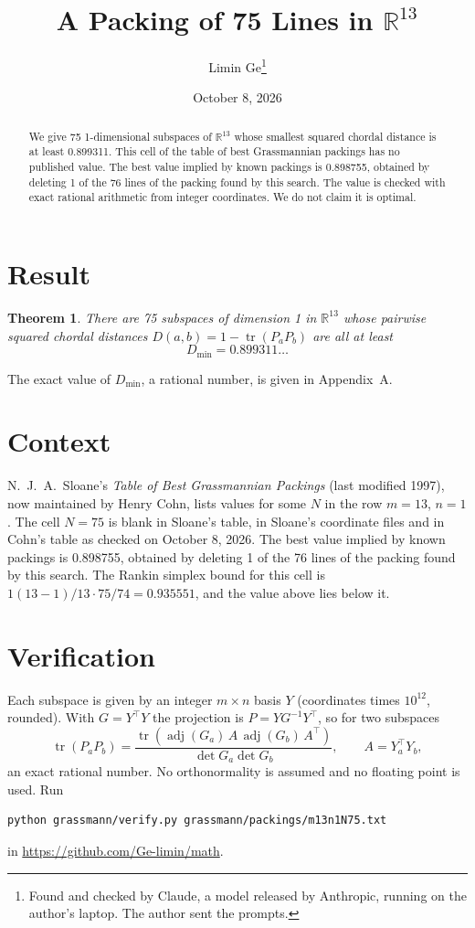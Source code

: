 \documentclass[11pt,a4paper]{article}
\title{A Packing of 75 Lines in $\mathbb{R}^{13}$}
\author{Limin Ge\thanks{Found and checked by Claude, a model released by Anthropic, running on the author's laptop. The author sent the prompts.}}
\date{October 8, 2026}
\newtheorem*{theorem}{Theorem}
\begin{document}
\maketitle
\begin{abstract}
We give 75 1-dimensional subspaces of $\mathbb{R}^{13}$ whose smallest squared chordal distance is at least 0.899311. This cell of the table of best Grassmannian packings has no published value. The best value implied by known packings is 0.898755, obtained by deleting 1 of the 76 lines of the packing found by this search. The value is checked with exact rational arithmetic from integer coordinates. We do not claim it is optimal.
\end{abstract}

\section{Result}
\begin{theorem}
There are 75 subspaces of dimension 1 in $\mathbb{R}^{13}$ whose pairwise squared chordal distances $D(a,b) = 1 - \operatorname{tr}(P_aP_b)$ are all at least
\[ D_{\min} = 0.899311\ldots \]
\end{theorem}
The exact value of $D_{\min}$, a rational number, is given in Appendix~A.


\section{Context}
N.~J.~A.~Sloane's \emph{Table of Best Grassmannian Packings} (last modified 1997), now maintained by Henry Cohn, lists values for some $N$ in the row $m=13$, $n=1$. The cell $N=75$ is blank in Sloane's table, in Sloane's coordinate files and in Cohn's table as checked on October 8, 2026. The best value implied by known packings is 0.898755, obtained by deleting 1 of the 76 lines of the packing found by this search. The Rankin simplex bound for this cell is $1(13-1)/13\cdot 75/74 = 0.935551$, and the value above lies below it.


\section{Verification}
Each subspace is given by an integer $m\times n$ basis $Y$ (coordinates times $10^{12}$, rounded). With $G=Y^\top Y$ the projection is $P=YG^{-1}Y^\top$, so for two subspaces
\[ \operatorname{tr}(P_aP_b)=\frac{\operatorname{tr}(\operatorname{adj}(G_a)\,A\,\operatorname{adj}(G_b)\,A^\top)}{\det G_a\det G_b},\qquad A=Y_a^\top Y_b, \]
an exact rational number. No orthonormality is assumed and no floating point is used. Run
\begin{verbatim}
python grassmann/verify.py grassmann/packings/m13n1N75.txt
\end{verbatim}
in \url{https://github.com/Ge-limin/math}.
\end{document}

